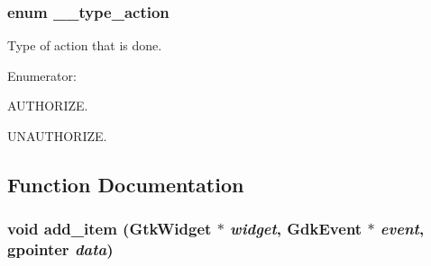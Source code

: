 \hypertarget{usb-gui_8c_a4a517367fd55e0e2fab7fa26d5f6cc57}{
\subsubsection[{\_\-\_\-type\_\-action}]{\setlength{\rightskip}{0pt plus 5cm}enum {\bf \_\-\_\-type\_\-action}}}
\label{usb-gui_8c_a4a517367fd55e0e2fab7fa26d5f6cc57}


Type of action that is done. 

\begin{Desc}
\item[Enumerator: ]\par
\begin{description}
\item[{\em 
\hypertarget{usb-gui_8c_a4a517367fd55e0e2fab7fa26d5f6cc57a7daed806ef87774bc0276855b435d28c}{
AUTHORIZE}
\label{usb-gui_8c_a4a517367fd55e0e2fab7fa26d5f6cc57a7daed806ef87774bc0276855b435d28c}
}]AUTHORIZE. \item[{\em 
\hypertarget{usb-gui_8c_a4a517367fd55e0e2fab7fa26d5f6cc57aa27a3c7ab0b97672a8c6bb7ba181840e}{
UNAUTHORIZE}
\label{usb-gui_8c_a4a517367fd55e0e2fab7fa26d5f6cc57aa27a3c7ab0b97672a8c6bb7ba181840e}
}]UNAUTHORIZE. \end{description}
\end{Desc}



\subsection{Function Documentation}
\hypertarget{usb-gui_8c_aafc00ee8c683e0173f3e064fcefd10a2}{
\subsubsection[{add\_\-item}]{\setlength{\rightskip}{0pt plus 5cm}void add\_\-item (GtkWidget $\ast$ {\em widget}, \/  GdkEvent $\ast$ {\em event}, \/  gpointer {\em data})}}
\label{usb-gui_8c_aafc00ee8c683e0173f3e064fcefd10a2}


